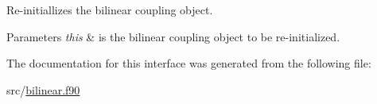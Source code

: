 Re-\/initiallizes the bilinear coupling object. 


\begin{DoxyParams}{Parameters}
{\em this} & is the bilinear coupling object to be re-\/initialized. \\
\hline
\end{DoxyParams}


The documentation for this interface was generated from the following file\+:\begin{DoxyCompactItemize}
\item 
src/\hyperlink{bilinear_8f90}{bilinear.\+f90}\end{DoxyCompactItemize}

